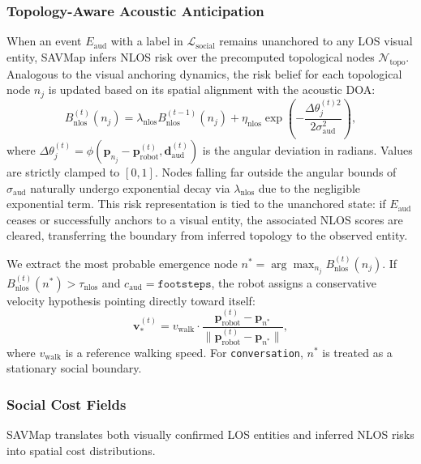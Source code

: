 \subsubsection{Topology-Aware Acoustic Anticipation}
When an event $E_{\mathrm{aud}}$ with a label in $\mathcal{L}_{\mathrm{social}}$ remains unanchored to any LOS visual entity, SAVMap infers NLOS risk over the precomputed topological nodes $\mathcal{N}_{\mathrm{topo}}$. Analogous to the visual anchoring dynamics, the risk belief for each topological node $n_j$ is updated based on its spatial alignment with the acoustic DOA:
\begin{equation}
    B_{\mathrm{nlos}}^{(t)}(n_j) = \lambda_{\mathrm{nlos}} B_{\mathrm{nlos}}^{(t-1)}(n_j) + \eta_{\mathrm{nlos}} \exp\left(-\frac{\Delta\theta_j^{(t)2}}{2\sigma_{\mathrm{aud}}^2}\right),
    \label{eq:nlos_score}
\end{equation}
where $\Delta\theta_j^{(t)} = \phi(\mathbf{p}_{n_j} - \mathbf{p}_{\mathrm{robot}}^{(t)}, \allowbreak \mathbf{d}_{\mathrm{aud}}^{(t)})$ is the angular deviation in radians. Values are strictly clamped to $[0,1]$. Nodes falling far outside the angular bounds of $\sigma_{\mathrm{aud}}$ naturally undergo exponential decay via $\lambda_{\mathrm{nlos}}$ due to the negligible exponential term. This risk representation is tied to the unanchored state: if $E_{\mathrm{aud}}$ ceases or successfully anchors to a visual entity, the associated NLOS scores are cleared, transferring the boundary from inferred topology to the observed entity.

We extract the most probable emergence node $n^* = \arg\max_{n_j} B_{\mathrm{nlos}}^{(t)}(n_j)$. If $B_{\mathrm{nlos}}^{(t)}(n^*) > \tau_{\mathrm{nlos}}$ and $c_{\mathrm{aud}} = \texttt{footsteps}$, the robot assigns a conservative velocity hypothesis pointing directly toward itself:
\begin{equation}
    \mathbf{v}_{*}^{(t)} = v_{\mathrm{walk}} \cdot \frac{\mathbf{p}_{\mathrm{robot}}^{(t)} - \mathbf{p}_{n^*}}{\|\mathbf{p}_{\mathrm{robot}}^{(t)} - \mathbf{p}_{n^*}\|},
    \label{eq:vel_hyp}
\end{equation}
where $v_{\mathrm{walk}}$ is a reference walking speed. For \texttt{conversation}, $n^*$ is treated as a stationary social boundary.

\subsubsection{Social Cost Fields}
SAVMap translates both visually confirmed LOS entities and inferred NLOS risks into spatial cost distributions.

